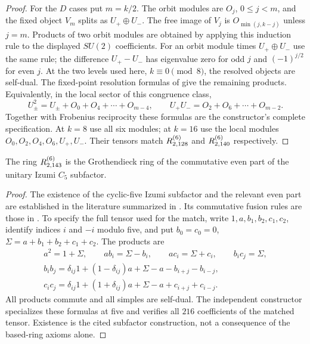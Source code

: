 \begin{proof}
For the $D$ cases put $m=k/2$. The orbit modules are $O_j$,
$0\le j<m$, and the fixed object $V_m$ splits as $U_+\oplus U_-$.
The free image of $V_j$ is $O_{\min(j,k-j)}$ unless $j=m$.
Products of two orbit modules are obtained by applying this induction
rule to the displayed $SU(2)$ coefficients. For an orbit module times
$U_+\oplus U_-$ use the same rule; the difference $U_+-U_-$ has
eigenvalue zero for odd $j$ and $(-1)^{j/2}$ for even $j$. At the two
levels used here, $k\equiv0\pmod8$, the resolved objects are self-dual.
The fixed-point resolution formulas of \cite[Section~7, $D_{2m}$ fusion
table]{KO} give the remaining products. Equivalently, in the local
sector of this congruence class,
\[
 U_\pm^2=U_\pm+O_0+O_4+\cdots+O_{m-4},\qquad
 U_+U_-=O_2+O_6+\cdots+O_{m-2}.
\]
Together with Frobenius reciprocity these formulas are the constructor's
complete specification. At $k=8$ use all six modules; at $k=16$ use the
local modules $O_0,O_2,O_4,O_6,U_+,U_-$. Their tensors match
$R^{(6)}_{2,128}$ and $R^{(6)}_{2,140}$ respectively.
\end{proof}

\begin{proposition}\label{prop:Izumimodel}
The ring $R^{(6)}_{2,143}$ is the Grothendieck ring of the commutative even
part of the unitary Izumi $C_5$ subfactor.
\end{proposition}
\begin{proof}
The existence of the cyclic-five Izumi subfactor and the relevant even
part are established in the literature summarized in
\cite[Section~6.6]{GS}. Its commutative fusion rules are those in
\cite[Theorem~7]{EG}. To specify the full tensor used for the match,
write $1,a,b_1,b_2,c_1,c_2$, identify indices $i$ and $-i$ modulo five,
and put $b_0=c_0=0$, $\Sigma=a+b_1+b_2+c_1+c_2$. The products are
\begin{gather*}
 a^2=1+\Sigma,\qquad ab_i=\Sigma-b_i,\qquad ac_i=\Sigma+c_i,\qquad b_ic_j=\Sigma,\\
 b_ib_j=\delta_{ij}1+(1-\delta_{ij})a+\Sigma-a-b_{i+j}-b_{i-j},\\
 c_ic_j=\delta_{ij}1+(1+\delta_{ij})a+\Sigma-a+c_{i+j}+c_{i-j}.
\end{gather*}
All products commute and all simples are self-dual. The independent
constructor specializes these formulas at five and verifies all $216$
coefficients of the matched tensor. Existence is the cited subfactor
construction, not a consequence of the based-ring axioms alone.
\end{proof}

